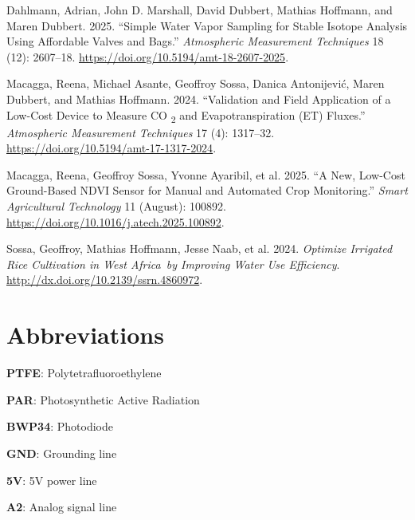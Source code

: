 \documentclass[
  11pt,
  letterpaper,
]{book}
\newlength{\cslhangindent}
\newenvironment{CSLReferences}[2] %
 {\begin{list}{}{%
  \setlength{\itemindent}{0pt}
  \setlength{\leftmargin}{0pt}
  \setlength{\parsep}{0pt}
  \ifodd #1
   \setlength{\leftmargin}{\cslhangindent}
   \setlength{\itemindent}{-1\cslhangindent}
  \fi
  \setlength{\itemsep}{#2\baselineskip}}}
 {\end{list}}
\begin{document}

\protect{}\label{refs}
\begin{CSLReferences}{1}{1}
Dahlmann, Adrian, John D. Marshall, David Dubbert, Mathias Hoffmann, and
Maren Dubbert. 2025. {``Simple Water Vapor Sampling for Stable Isotope
Analysis Using Affordable Valves and Bags.''} \emph{Atmospheric
Measurement Techniques} 18 (12): 2607--18.
\url{https://doi.org/10.5194/amt-18-2607-2025}.

Macagga, Reena, Michael Asante, Geoffroy Sossa, Danica Antonijević,
Maren Dubbert, and Mathias Hoffmann. 2024. {``Validation and Field
Application of a Low-Cost Device to Measure CO {\textsubscript{2}} and
Evapotranspiration (ET) Fluxes.''} \emph{Atmospheric Measurement
Techniques} 17 (4): 1317--32.
\url{https://doi.org/10.5194/amt-17-1317-2024}.

Macagga, Reena, Geoffroy Sossa, Yvonne Ayaribil, et al. 2025. {``A New,
Low-Cost Ground-Based NDVI Sensor for Manual and Automated Crop
Monitoring.''} \emph{Smart Agricultural Technology} 11 (August): 100892.
\url{https://doi.org/10.1016/j.atech.2025.100892}.

Sossa, Geoffroy, Mathias Hoffmann, Jesse Naab, et al. 2024.
\emph{Optimize Irrigated Rice Cultivation in West Africa~by Improving
Water Use Efficiency}. \url{http://dx.doi.org/10.2139/ssrn.4860972}.

\end{CSLReferences}


\chapter*{Abbreviations}\label{abbreviations}


\textbf{PTFE}: Polytetrafluoroethylene

\textbf{PAR}: Photosynthetic Active Radiation

\textbf{BWP34}: Photodiode

\textbf{GND}: Grounding line

\textbf{5V}: 5V power line

\textbf{A2}: Analog signal line
\end{document}

